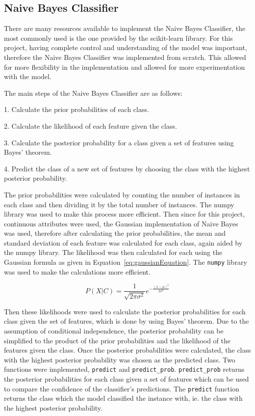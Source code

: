 \subsection{Naive Bayes Classifier}

There are many resources available to implement the Naive Bayes Classifier, the most commonly used is the one provided by the scikit-learn library. For this project, having complete control and understanding of the model was important, therefore the Naive Bayes Classifier was implemented from scratch. This allowed for more flexibility in the implementation and allowed for more experimentation with the model. 

The main steps of the Naive Bayes Classifier are as follows:


1. Calculate the prior probabilities of each class.

2. Calculate the likelihood of each feature given the class.

3. Calculate the posterior probability for a class given a set of features using Bayes' theorem.

4. Predict the class of a new set of features by choosing the class with the highest posterior probability.

The prior probabilities were calculated by counting the number of instances in each class and then dividing it by the total number of instances. The numpy library was used to make this process more efficient. Then since for this project, continuous attributes were used, the Gaussian implementation of Naive Bayes was used, therefore after calculating the prior probabilities, the mean and standard deviation of each feature was calculated for each class, again aided by the numpy library.  The likelihood was then calculated for each using the Gaussian formula as given in Equation~\ref{eq:gaussianEquation}. The \texttt{numpy} library was used to make the calculations more efficient.


\begin{equation}
    \label{eq:gaussianEquation}
    P(X | C) = \frac{1}{\sqrt{2\pi\sigma^2}} e^{-\frac{(x - \mu)^2}{2\sigma^2}}
\end{equation}

Then these likelihoods were used to calculate the posterior probabilities for each class given the set of features, which is done by using Bayes' theorem. Due to the assumption of conditional independence, the posterior probability can be simplified to the product of the prior probabilities and the likelihood of the features given the class. Once the posterior probabilities were calculated, the class with the highest posterior probability was chosen as the predicted class. Two functions were implemented, \texttt{predict} and \texttt{predict\_prob}. \texttt{predict\_prob} returns the posterior probabilities for each class given a set of features which can be used to compare the confidence of the classifier's predictions. The \texttt{predict} function returns the class which the model classified the instance with, ie. the class with the highest posterior probability.

